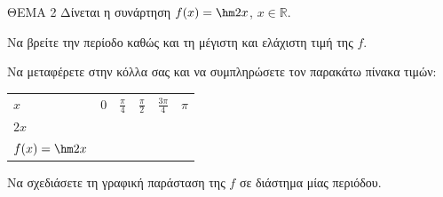 ΘEMA 2
Δίνεται η συνάρτηση $f(x) = \hm  2x$, $x \in \mathbb{R}$.
\begin{alist}
\item Να βρείτε την περίοδο καθώς και τη μέγιστη και ελάχιστη τιμή της $f$.
\item
\begin{rlist}
\item Να μεταφέρετε στην κόλλα σας και να συμπληρώσετε τον παρακάτω πίνακα τιμών:
\begin{longtable}[]{@{}
  >{\centering\arraybackslash}p{}
  >{\centering\arraybackslash}p{}
  >{\centering\arraybackslash}p{}
  >{\centering\arraybackslash}p{}
  >{\centering\arraybackslash}p{}
  >{\centering\arraybackslash}p{}@{}}
\noalign{}
\begin{minipage}[b]{\linewidth}\centering
$x$
\end{minipage} & \begin{minipage}[b]{\linewidth}\centering
$0$
\end{minipage} & \begin{minipage}[b]{\linewidth}\centering
$\frac{\pi}{4}$
\end{minipage} & \begin{minipage}[b]{\linewidth}\centering
$\frac{\pi}{2}$
\end{minipage} & \begin{minipage}[b]{\linewidth}\centering
$\frac{3\pi}{4}$
\end{minipage} & \begin{minipage}[b]{\linewidth}\centering
$\pi$
\end{minipage} \\
\noalign{}
\noalign{}
\endlastfoot
$2x$ & & & & & \\
$f(x) = \hm  2x$ & & & & & \\
\end{longtable}
\item Να σχεδιάσετε τη γραφική παράσταση της $f$ σε διάστημα μίας περιόδου.
\end{rlist}
\end{alist}

